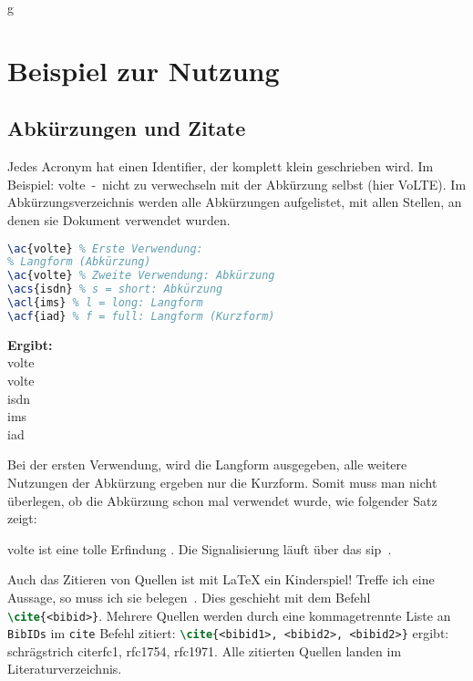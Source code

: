 g%
\chapter{Beispiel zur Nutzung}
\section{Abkürzungen und Zitate}
Jedes Acronym hat einen Identifier, der komplett klein geschrieben wird. Im Beispiel: volte~-~nicht zu verwechseln mit der Abkürzung selbst (hier VoLTE). Im Abkürzungsverzeichnis werden alle Abkürzungen aufgelistet, mit allen Stellen, an denen sie Dokument verwendet wurden. 

\begin{minipage}{.6\textwidth}
\begin{lstlisting}[language=latex]
\ac{volte} % Erste Verwendung: 
% Langform (Abkürzung)
\ac{volte} % Zweite Verwendung: Abkürzung
\acs{isdn} % s = short: Abkürzung
\acl{ims} % l = long: Langform
\acf{iad} % f = full: Langform (Kurzform)
\end{lstlisting}   
\end{minipage}
\begin{minipage}{.4\textwidth}
	\footnotesize
	\textbf{Ergibt:}\\
	\ac{volte}\\
	\ac{volte}\\
	\acs{isdn}\\
	\acl{ims}\\
	\acf{iad} 
\end{minipage}

Bei der ersten Verwendung, wird die Langform ausgegeben, alle weitere Nutzungen der Abkürzung ergeben nur die Kurzform. Somit muss man nicht überlegen, ob die Abkürzung schon mal verwendet wurde, wie folgender Satz zeigt: 

\Ac{volte} ist eine tolle Erfindung \cite{3GPP.TS.24.228.v5.15.0}. Die Signalisierung läuft über das \ac{sip}~\cite{wikiNik}. \cite[S.~23]{fernandezgallardo_InstitutFurSoftwaretechnik_2017}
\cite[S.~50]{arnold2000java}

Auch das Zitieren von Quellen ist mit \LaTeX{} ein Kinderspiel! Treffe ich eine Aussage, so muss ich sie belegen~\cite{rfc2693}. Dies geschieht mit dem Befehl \lstinline[language=latex]|\cite{<bibid>}|. Mehrere Quellen werden durch eine kommagetrennte Liste an \texttt{BibIDs} im \texttt{cite} Befehl zitiert: \lstinline[language=latex]|\cite{<bibid1>, <bibid2>, <bibid2>}| ergibt: schrägstrich cite{rfc1, rfc1754, rfc1971}. Alle zitierten Quellen landen im Literaturverzeichnis.
